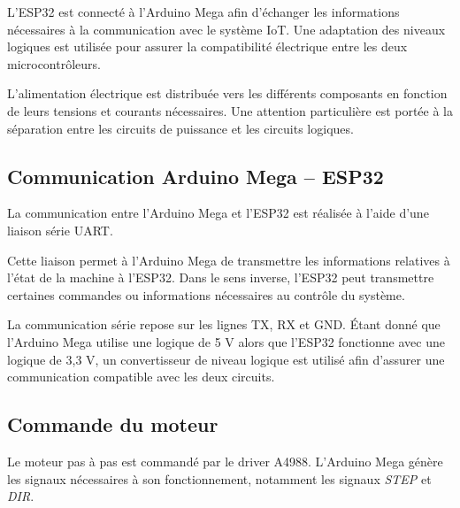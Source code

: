L'ESP32 est connecté à l'Arduino Mega afin d'échanger les informations
nécessaires à la communication avec le système IoT. Une adaptation des
niveaux logiques est utilisée pour assurer la compatibilité électrique
entre les deux microcontrôleurs.

L'alimentation électrique est distribuée vers les différents composants
en fonction de leurs tensions et courants nécessaires. Une attention
particulière est portée à la séparation entre les circuits de puissance
et les circuits logiques.

%

\subsection{Communication Arduino Mega -- ESP32}

La communication entre l'Arduino Mega et l'ESP32 est réalisée à l'aide
d'une liaison série UART.

Cette liaison permet à l'Arduino Mega de transmettre les informations
relatives à l'état de la machine à l'ESP32. Dans le sens inverse, l'ESP32
peut transmettre certaines commandes ou informations nécessaires au
contrôle du système.

La communication série repose sur les lignes TX, RX et GND. Étant donné
que l'Arduino Mega utilise une logique de 5 V alors que l'ESP32 fonctionne
avec une logique de 3,3 V, un convertisseur de niveau logique est utilisé
afin d'assurer une communication compatible avec les deux circuits.

%

\subsection{Commande du moteur}

Le moteur pas à pas est commandé par le driver A4988. L'Arduino Mega
génère les signaux nécessaires à son fonctionnement, notamment les
signaux \textit{STEP} et \textit{DIR}.

